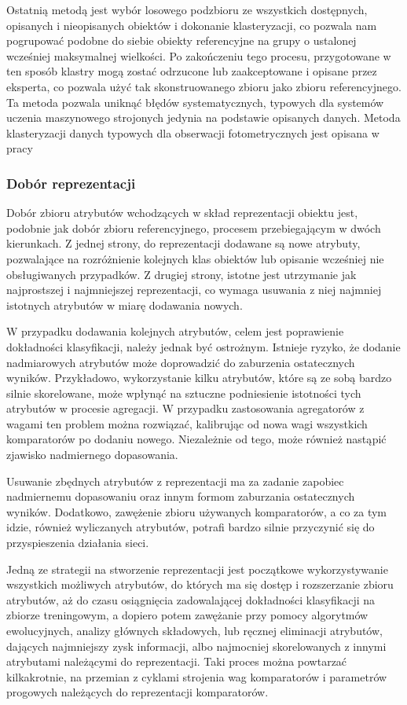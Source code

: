 \documentclass{pracalicmgr}
\begin{document}
    Ostatnią metodą jest wybór losowego podzbioru ze wszystkich dostępnych, opisanych i nieopisanych obiektów i dokonanie klasteryzacji, co pozwala nam pogrupować podobne do siebie obiekty referencyjne na grupy o ustalonej wcześniej maksymalnej wielkości. Po zakończeniu tego procesu, przygotowane w ten sposób klastry mogą zostać odrzucone lub zaakceptowane i opisane przez eksperta, co pozwala użyć tak skonstruowanego zbioru jako zbioru referencyjnego. Ta metoda pozwala uniknąć błędów systematycznych, typowych dla systemów uczenia maszynowego strojonych jedynia na podstawie opisanych danych. Metoda klasteryzacji danych typowych dla obserwacji fotometrycznych jest opisana w pracy %
    \subsubsection{Dobór reprezentacji} \label{training:repr}
    Dobór zbioru atrybutów wchodzących w skład reprezentacji obiektu jest, podobnie jak dobór zbioru referencyjnego, procesem przebiegającym w dwóch kierunkach. Z jednej strony, do reprezentacji dodawane są nowe atrybuty, pozwalające na rozróżnienie kolejnych klas obiektów lub opisanie wcześniej nie obsługiwanych przypadków. Z drugiej strony, istotne jest utrzymanie jak najprostszej i najmniejszej reprezentacji, co wymaga usuwania z niej najmniej istotnych atrybutów w miarę dodawania nowych.
    
    W przypadku dodawania kolejnych atrybutów, celem jest poprawienie dokładności klasyfikacji, należy jednak być ostrożnym. Istnieje ryzyko, że dodanie nadmiarowych atrybutów może doprowadzić do zaburzenia ostatecznych wyników. Przykładowo, wykorzystanie kilku atrybutów, które są ze sobą bardzo silnie skorelowane, może wpłynąć na sztuczne podniesienie istotności tych atrybutów w procesie agregacji. W przypadku zastosowania agregatorów z wagami ten problem można rozwiązać, kalibrując od nowa wagi wszystkich komparatorów po dodaniu nowego. Niezależnie od tego, może również nastąpić zjawisko nadmiernego dopasowania. 
    
    Usuwanie zbędnych atrybutów z reprezentacji ma za zadanie zapobiec nadmiernemu dopasowaniu oraz innym formom zaburzania ostatecznych wyników. Dodatkowo, zawężenie zbioru  używanych komparatorów, a co za tym idzie, również wyliczanych atrybutów, potrafi bardzo silnie przyczynić się do przyspieszenia działania sieci.

    Jedną ze strategii na stworzenie reprezentacji jest początkowe wykorzystywanie wszystkich możliwych atrybutów, do których ma się dostęp i rozszerzanie zbioru atrybutów, aż do czasu osiągnięcia zadowalającej dokładności klasyfikacji na zbiorze treningowym, a dopiero potem zawężanie przy pomocy algorytmów ewolucyjnych, analizy głównych składowych, lub ręcznej eliminacji atrybutów, dających najmniejszy zysk informacji, albo najmocniej skorelowanych z innymi atrybutami należącymi do reprezentacji. Taki proces można powtarzać kilkakrotnie, na przemian z cyklami strojenia wag komparatorów i parametrów progowych należących do reprezentacji komparatorów.
    
\end{document}
